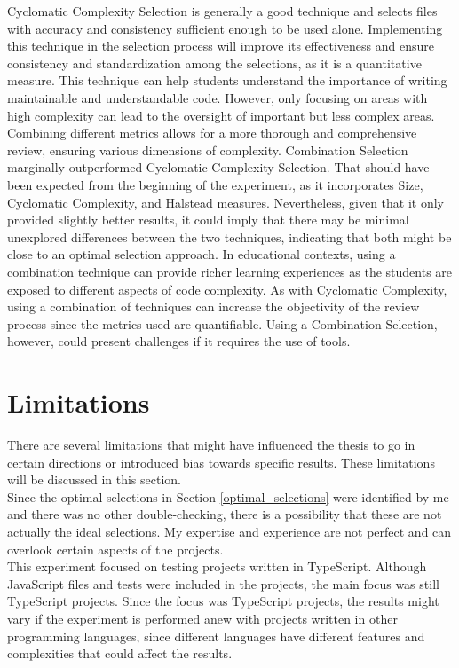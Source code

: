 Cyclomatic Complexity Selection is generally a good technique and selects files with accuracy and consistency sufficient enough to be used alone. Implementing this technique in the selection process will improve its effectiveness and ensure consistency and standardization among the selections, as it is a quantitative measure. This technique can help students understand the importance of writing maintainable and understandable code. However, only focusing on areas with high complexity can lead to the oversight of important but less complex areas. \\


Combining different metrics allows for a more thorough and comprehensive review, ensuring various dimensions of complexity. Combination Selection marginally outperformed Cyclomatic Complexity Selection. That should have been expected from the beginning of the experiment, as it incorporates Size, Cyclomatic Complexity, and Halstead measures. Nevertheless, given that it only provided slightly better results, it could imply that there may be minimal unexplored differences between the two techniques, indicating that both might be close to an optimal selection approach. In educational contexts, using a combination technique can provide richer learning experiences as the students are exposed to different aspects of code complexity. As with Cyclomatic Complexity, using a combination of techniques can increase the objectivity of the review process since the metrics used are quantifiable. Using a Combination Selection, however, could present challenges if it requires the use of tools.



\section{Limitations}
There are several limitations that might have influenced the thesis to go in certain directions or introduced bias towards specific results. These limitations will be discussed in this section. \\

Since the optimal selections in Section \ref{optimal_selections} were identified by me and there was no other double-checking, there is a possibility that these are not actually the ideal selections. My expertise and experience are not perfect and can overlook certain aspects of the projects. \\

This experiment focused on testing projects written in TypeScript. Although JavaScript files and tests were included in the projects, the main focus was still TypeScript projects. Since the focus was TypeScript projects, the results might vary if the experiment is performed anew with projects written in other programming languages, since different languages have different features and complexities that could affect the results. \\

